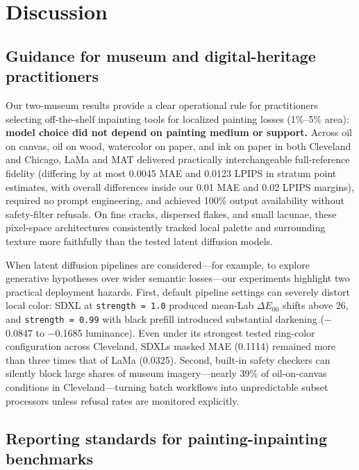 \documentclass[fleqn,12pt,lineno]{wlpeerj}
\begin{document}
\section{Discussion}\label{discussion}

\subsection{Guidance for museum and digital-heritage practitioners}\label{guidance-for-museum-and-digital-heritage-practitioners}

Our two-museum results provide a clear operational rule for practitioners selecting off-the-shelf inpainting tools for localized painting losses (1\%--5\% area): \textbf{model choice did not depend on painting medium or support.} Across oil on canvas, oil on wood, watercolor on paper, and ink on paper in both Cleveland and Chicago, LaMa and MAT delivered practically interchangeable full-reference fidelity (differing by at most 0.0045 MAE and 0.0123 LPIPS in stratum point estimates, with overall differences inside our 0.01 MAE and 0.02 LPIPS margins), required no prompt engineering, and achieved 100\% output availability without safety-filter refusals. On fine cracks, dispersed flakes, and small lacunae, these pixel-space architectures consistently tracked local palette and surrounding texture more faithfully than the tested latent diffusion models.

When latent diffusion pipelines are considered---for example, to explore generative hypotheses over wider semantic losses---our experiments highlight two practical deployment hazards. First, default pipeline settings can severely distort local color: SDXL at \texttt{strength\ =\ 1.0} produced mean-Lab \texttt{\ensuremath{\Delta E_{00}}} shifts above 26, and \texttt{strength\ =\ 0.99} with black prefill introduced substantial darkening (\ensuremath{-}0.0847 to \ensuremath{-}0.1685 luminance). Even under its strongest tested ring-color configuration across Cleveland, SDXL\textquotesingle s masked MAE (0.1114) remained more than three times that of LaMa (0.0325). Second, built-in safety checkers can silently block large shares of museum imagery---nearly 39\% of oil-on-canvas conditions in Cleveland---turning batch workflows into unpredictable subset processors unless refusal rates are monitored explicitly.

\subsection{Reporting standards for painting-inpainting benchmarks}\label{reporting-standards-for-painting-inpainting-benchmarks}
\end{document}

